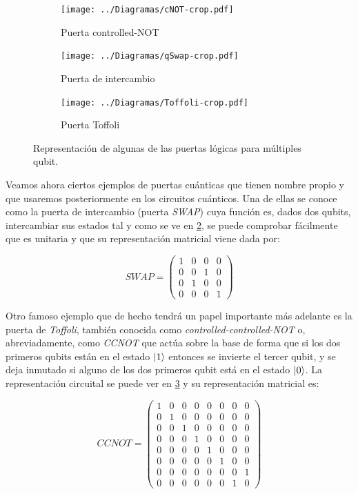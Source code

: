 \documentclass[11pt, spanish]{report}
\numberwithin{equation}{section}
\numberwithin{defin}{section}
\begin{document}
\begin{figure}
\begin{subfigure}{.33\textwidth}
  \centering
  \texttt{[image: ../Diagramas/cNOT-crop.pdf]}
  \caption{Puerta controlled-NOT}
  \label{fig2:sfig1}
\end{subfigure}%
\begin{subfigure}{.33\textwidth}
  \centering
  \texttt{[image: ../Diagramas/qSwap-crop.pdf]}
  \caption{Puerta de intercambio}
  \label{fig2:sfig2}
\end{subfigure}%
\begin{subfigure}{.33\textwidth}
  \centering
  \texttt{[image: ../Diagramas/Toffoli-crop.pdf]}
  \caption{Puerta Toffoli}
  \label{fig2:sfig3}
\end{subfigure}
\caption{Representación de algunas de las puertas lógicas para múltiples qubit.}
\label{fig2:figCircuitos}
\end{figure}

Veamos ahora ciertos ejemplos de puertas cuánticas que tienen nombre propio y que usaremos posteriormente en los circuitos cuánticos. Una de ellas se conoce como la puerta de intercambio (puerta \emph{SWAP}) cuya función es, dados dos qubits, intercambiar sus estados tal y como se ve en \ref{fig2:sfig2}, se puede comprobar fácilmente que es unitaria y que su representación matricial viene dada por:

\begin{equation} 
SWAP = \begin{pmatrix}
1 & 0 & 0 & 0 \\ 0 & 0 & 1 & 0 \\ 0 & 1 & 0 & 0 \\ 0 & 0 & 0 & 1 
\end{pmatrix}
\end{equation}

Otro famoso ejemplo que de hecho tendrá un papel importante más adelante es la puerta de \emph{Toffoli}, también conocida como \emph{controlled-controlled-NOT} o, abreviadamente, como \emph{CCNOT} que actúa sobre la base de forma que si los dos primeros qubits están en el estado $\ket{1}$ entonces se invierte el tercer qubit, y se deja inmutado si alguno de los dos primeros qubit está en el estado $\ket{0}$. La representación circuital se puede ver en \ref{fig2:sfig3} y su representación matricial es:

\begin{equation}
CCNOT = \begin{pmatrix}
1 & 0 & 0 & 0 & 0 & 0 & 0 & 0 \\
0 & 1 & 0 & 0 & 0 & 0 & 0 & 0 \\
0 & 0 & 1 & 0 & 0 & 0 & 0 & 0 \\
0 & 0 & 0 & 1 & 0 & 0 & 0 & 0 \\
0 & 0 & 0 & 0 & 1 & 0 & 0 & 0 \\
0 & 0 & 0 & 0 & 0 & 1 & 0 & 0 \\
0 & 0 & 0 & 0 & 0 & 0 & 0 & 1 \\
0 & 0 & 0 & 0 & 0 & 0 & 1 & 0
\end{pmatrix}
\end{equation} 
\end{document}
